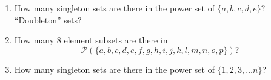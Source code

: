 \begin{enumerate}
\wbvfill


\item How many singleton sets are there in the power set of 
$\{a,b,c,d,e\}$?  ``Doubleton'' sets?

\wbvfill

\item How many 8 element subsets are there in
\[ {\mathcal P}(\{a,b,c,d,e,f,g,h,i,j,k,l,m,n,o,p\})? \]

\wbvfill

\item How many singleton sets are there in the power set of 
$\{1,2,3, \ldots n\}$?

\wbvfill

\workbookpagebreak

\end{enumerate}




